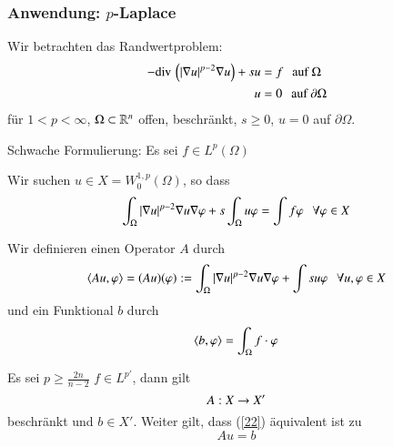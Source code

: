 \subsubsection*{Anwendung: $p$-Laplace}

Wir betrachten das Randwertproblem:
\begin{align}\label{23}
    \begin{split}
    -\mathrm{div}\,\left( |\nabla u|^{p-2} \nabla u \right) + su &=f \hspace{.25cm} \text{auf } \Omega\\
    u&=0\hspace{.25cm} \text{auf } \partial \Omega
    \end{split}
\end{align}
für $1<p<\infty$, $\Omega\subset\mathbb{R}^n$ offen, beschränkt, $s\geq 0$, $u=0$ auf $\partial\Omega$.

\noindent Schwache Formulierung: Es sei $f\in L^p (\Omega)$

Wir suchen $u\in X= W^{1,p}_0(\Omega)$, so dass
\begin{align}\label{22}
    \int_\Omega |\nabla u|^{p-2} \nabla u \nabla \varphi + s\int_{\Omega}u\varphi=\int f\varphi \hspace{.25cm} \forall \varphi \in X
\end{align}

Wir definieren einen Operator $A$ durch
\[
    \langle Au,\varphi\rangle = (Au)(\varphi) := \int_\Omega |\nabla u|^{p-2}\nabla u \nabla \varphi +\int su\varphi \hspace{.25cm} 
    \forall u,\varphi \in X
\]
und ein Funktional $b$ durch
\[
\langle b,\varphi \rangle = \int_\Omega f\cdot \varphi
\]

\begin{lem}\label{4.10}
    Es sei $p\geq \frac{2n}{n-2}$ $f\in L^{p'}$, dann gilt
    \[
        A:X\rightarrow X'
    \]
    beschränkt und $b\in X'$. Weiter gilt, dass (\ref{22}) äquivalent ist zu
    \[
        Au=b
    \]
\end{lem}

